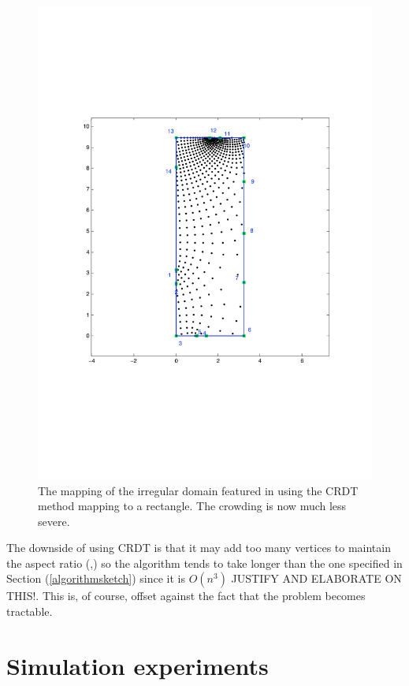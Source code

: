\begin{figure} [tbp]
\centering
\includegraphics[scale=0.5]{sc/figs/irregular-fixed-crdt.pdf}
\caption{The mapping of the irregular domain featured in  using the CRDT method mapping to a rectangle. The crowding is now much less severe.}
\label{uncrowdeddisk}
\end{figure}

The downside of using CRDT is that it may add too many vertices to maintain the aspect ratio (\cite{driscoll05},) so the algorithm tends to take longer than the one specified in Section (\ref{algorithmsketch}) since it is $O(n^3)$ JUSTIFY AND ELABORATE ON THIS!. This is, of course, offset against the fact that the problem becomes tractable.






\section{Simulation experiments}


